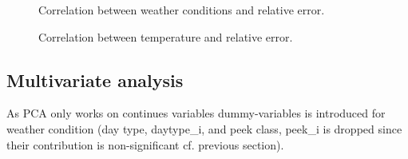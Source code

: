 \begin{figure}[!ht]
    \center
    
    \caption{Correlation between weather conditions and relative error.}
    \label{fig:cor_cond}
\end{figure}

\begin{figure}[!ht]
    \center
    
    \caption{Correlation between temperature and relative error.}
    \label{fig:cor_temp}
\end{figure}

\subsection{Multivariate analysis}
As PCA only works on continues variables dummy-variables is introduced for weather condition (day type, \gls{daytype_i}, and peek class, \gls{peek_i} is dropped since their contribution is non-significant cf. previous section).